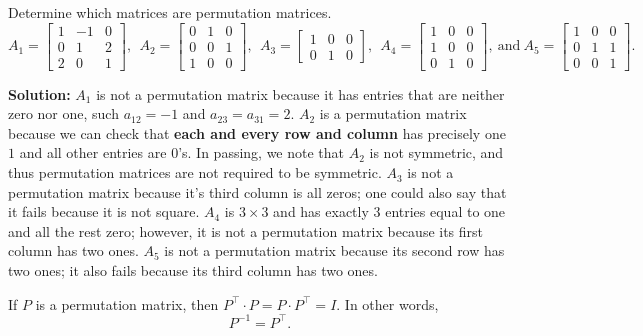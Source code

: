 \begin{example} Determine which matrices are permutation matrices.
$$
A_1=\left[
\begin{array}{rrr}
1 & -1 & 0\\
0& 1 & 2\\
2 & 0 &1
\end{array} \right],~~A_2=\left[
\begin{array}{rrr}
0 & 1 & 0\\
0 & 0 & 1\\
1 & 0 & 0
\end{array} \right],~~
A_3=\left[
\begin{array}{ccc}
1 & 0 & 0\\
0& 1 & 0
\end{array} \right],~~A_4=\left[
\begin{array}{ccc}
1 & 0 & 0\\
1& 0 & 0 \\
0 & 1 & 0
\end{array} \right], ~\text{and}~A_5=\left[
\begin{array}{rrr}
1& 0 & 0\\
0 & 1 & 1\\
0& 0 & 1
\end{array} \right].
$$

\end{example}

\textbf{Solution:} $A_1$ is not a permutation matrix because it has entries that are neither zero nor one, such $a_{12}=-1$ and $a_{23}=a_{31}=2$. $A_2$ is a permutation matrix because we can check that \textbf{each and every row and column} has precisely one $1$ and all other entries are $0$'s. In passing, we note that $A_2$ is not symmetric, and thus permutation matrices are not required to be symmetric. $A_3$ is not a permutation matrix because it's third column is all zeros; one could also say that it fails because it is not square. $A_4$ is $3 \times 3$ and has exactly $3$ entries equal to one and all the rest zero; however, it is not a permutation matrix because its first column has two ones. $A_5$ is not a permutation matrix because its second row has two ones; it also fails because its third column has two ones. 
\Qed
\vspace*{.1cm}

\begin{tcolorbox}[sharp corners, colback=green!30, colframe=green!80!blue, title=\textbf{Inverting a Permutation Matrix is Cake}]
If $P$ is a permutation matrix, then $P^\top \cdot P = P\cdot  P^\top = I$. In other words,  $$P^{-1}= P^\top. $$
\end{tcolorbox}
\vspace*{0.1cm}

